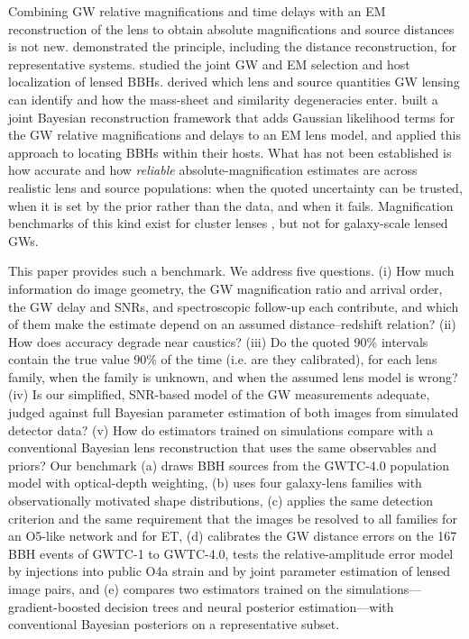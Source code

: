 Combining GW relative magnifications and time delays with an EM reconstruction of the lens to obtain absolute magnifications and source distances is not new. \citet{hannuksela2020localizing} demonstrated the principle, including the distance reconstruction, for representative systems. \citet{wempe2022lensing} studied the joint GW and EM selection and host localization of lensed BBHs. \citet{poon2025degeneracy} derived which lens and source quantities GW lensing can identify and how the mass-sheet and similarity degeneracies enter. \citet{uronen2026silmarel} built a joint Bayesian reconstruction framework that adds Gaussian likelihood terms for the GW relative magnifications and delays to an EM lens model, and \citet{uronen2026galacticcentres} applied this approach to locating BBHs within their hosts. What has not been established is how accurate and how \emph{reliable} absolute-magnification estimates are across realistic lens and source populations: when the quoted uncertainty can be trusted, when it is set by the prior rather than the data, and when it fails. Magnification benchmarks of this kind exist for cluster lenses \citep{meneghetti2017ff}, but not for galaxy-scale lensed GWs.

This paper provides such a benchmark. We address five questions. (i) How much information do image geometry, the GW magnification ratio and arrival order, the GW delay and SNRs, and spectroscopic follow-up each contribute, and which of them make the estimate depend on an assumed distance--redshift relation? (ii) How does accuracy degrade near caustics? (iii) Do the quoted 90\% intervals contain the true value 90\% of the time (i.e. are they calibrated), for each lens family, when the family is unknown, and when the assumed lens model is wrong? (iv) Is our simplified, SNR-based model of the GW measurements adequate, judged against full Bayesian parameter estimation of both images from simulated detector data? (v) How do estimators trained on simulations compare with a conventional Bayesian lens reconstruction that uses the same observables and priors? Our benchmark (a) draws BBH sources from the GWTC-4.0 population model \citep{lvk2025gwtc4pop} with optical-depth weighting, (b) uses four galaxy-lens families with observationally motivated shape distributions, (c) applies the same detection criterion and the same requirement that the images be resolved to all families for an O5-like network and for ET, (d) calibrates the GW distance errors on the 167 BBH events of GWTC-1 to GWTC-4.0, tests the relative-amplitude error model by injections into public O4a strain and by joint parameter estimation of lensed image pairs, and (e) compares two estimators trained on the simulations---gradient-boosted decision trees and neural posterior estimation---with conventional Bayesian posteriors on a representative subset.

